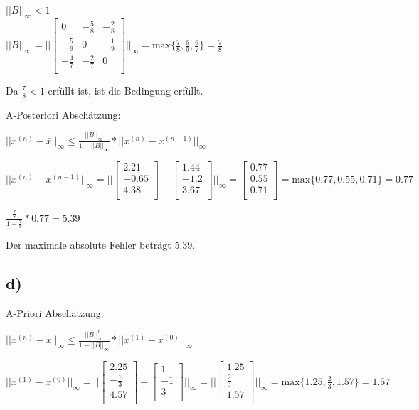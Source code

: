 \documentclass{article}
\begin{document}
\(||B||_\infty < 1\)\\
\(
||B||_\infty
=
||
\begin{bmatrix} 
0 & -\frac{5}{8} & -\frac{2}{8} \\
-\frac{5}{9} & 0 & -\frac{1}{9} \\
-\frac{4}{7} & -\frac{2}{7} & 0 \\
\end{bmatrix}
||_\infty
=
\text{max}\{\frac{7}{8},\frac{6}{9},\frac{6}{7}\}
=
\frac{7}{8}
\)

Da \(\frac{7}{8} < 1\) erfüllt ist, ist die Bedingung erfüllt.

\vspace{5mm}

A-Posteriori Abschätzung:

\(||x^{(n)} - \overset{\_}{x}||_\infty \leq \frac{||B||_\infty}{1 - ||B||_\infty} * ||x^{(n)} - x^{(n-1)}||_\infty\)

\(
||x^{(n)} - x^{(n-1)}||_\infty
=
||
\begin{bmatrix} 
2.21\\
-0.65\\
4.38\\
\end{bmatrix}
-
\begin{bmatrix} 
1.44\\
-1.2\\
3.67\\
\end{bmatrix}
||_\infty
=
\begin{bmatrix} 
0.77\\
0.55\\
0.71\\
\end{bmatrix}
=
\text{max}\{0.77,0.55,0.71\}
=
0.77
\)

\(\frac{\frac{7}{8}}{1 - \frac{7}{8}} * 0.77 = 5.39\)

Der maximale absolute Fehler beträgt 5.39.

\subsection*{d)}

A-Priori Abschätzung:

\(||x^{(n)} - \overset{\_}{x}||_\infty \leq \frac{||B||_\infty^n}{1 - ||B||_\infty} * ||x^{(1)} - x^{(0)}||_\infty\)

\(
||x^{(1)} - x^{(0)}||_\infty
=
||
\begin{bmatrix} 
2.25\\
-\frac{1}{3}\\
4.57\\
\end{bmatrix}
-
\begin{bmatrix} 
1\\
-1\\
3\\
\end{bmatrix}
||_\infty
=
||
\begin{bmatrix} 
1.25\\
\frac{2}{3}\\
1.57\\
\end{bmatrix}
||_\infty
=
\text{max}\{1.25,\frac{2}{3},1.57\} = 1.57
\)
\end{document}

